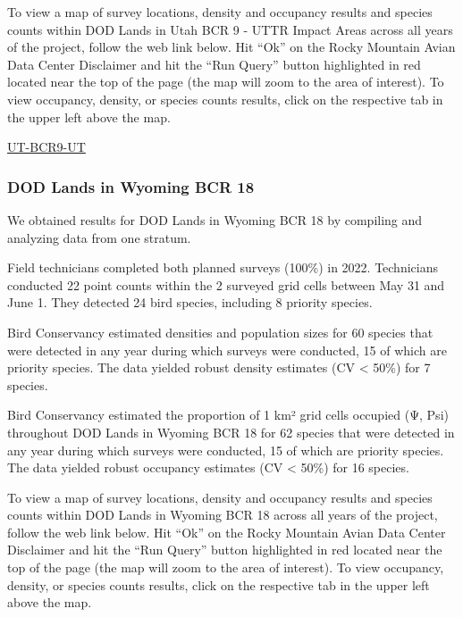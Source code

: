 \documentclass[
  letterpaper,
  DIV=11,
  numbers=noendperiod,
  oneside]{scrreprt}
\begin{document}
To view a map of survey locations, density and occupancy results and
species counts within DOD Lands in Utah BCR 9 - UTTR Impact Areas across
all years of the project, follow the web link below. Hit ``Ok'' on the
Rocky Mountain Avian Data Center Disclaimer and hit the ``Run Query''
button highlighted in red located near the top of the page (the map will
zoom to the area of interest). To view occupancy, density, or species
counts results, click on the respective tab in the upper left above the
map.

\href{http://www.rmbo.org/new_site/adc/QueryWindow.aspx\#N4IgzgLgTghhCuBbEAuABCAqgFQLQCEBhAJQE5cd0ARAUwAcYoJEaA7CNAewDM1bu2YGmlxoc2YmgCSiBgGMOAQSg0YYEAF8gA==}{UT-BCR9-UT}

\hypertarget{dod-lands-in-wyoming-bcr-18}{%
\subsubsection{DOD Lands in Wyoming BCR
18}\label{dod-lands-in-wyoming-bcr-18}}

We obtained results for DOD Lands in Wyoming BCR 18 by compiling and
analyzing data from one stratum.

Field technicians completed both planned surveys (100\%) in 2022.
Technicians conducted 22 point counts within the 2 surveyed grid cells
between May 31 and June 1. They detected 24 bird species, including 8
priority species.

Bird Conservancy estimated densities and population sizes for 60 species
that were detected in any year during which surveys were conducted, 15
of which are priority species. The data yielded robust density estimates
(CV \textless{} 50\%) for 7 species.

Bird Conservancy estimated the proportion of 1 km² grid cells occupied
(Ψ, Psi) throughout DOD Lands in Wyoming BCR 18 for 62 species that were
detected in any year during which surveys were conducted, 15 of which
are priority species. The data yielded robust occupancy estimates (CV
\textless{} 50\%) for 16 species.

To view a map of survey locations, density and occupancy results and
species counts within DOD Lands in Wyoming BCR 18 across all years of
the project, follow the web link below. Hit ``Ok'' on the Rocky Mountain
Avian Data Center Disclaimer and hit the ``Run Query'' button
highlighted in red located near the top of the page (the map will zoom
to the area of interest). To view occupancy, density, or species counts
results, click on the respective tab in the upper left above the map.
\end{document}
